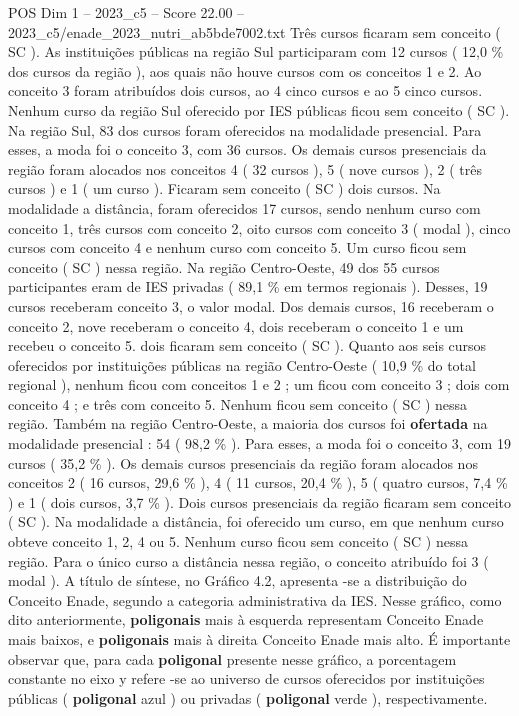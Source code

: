 \begin{textsample}{POS Dim 1 – 2023\_c5 – Score 22.00 – 2023\_c5/enade\_2023\_nutri\_ab5bde7002.txt}
Três cursos ficaram sem conceito ( SC ).
As instituições públicas na região Sul participaram com 12 cursos ( 12,0 \% dos cursos da região ), aos quais não houve cursos com os conceitos 1 e 2.
Ao conceito 3 foram atribuídos dois cursos, ao 4 cinco cursos e ao 5 cinco cursos.
Nenhum curso da região Sul oferecido por IES públicas ficou sem conceito ( SC ).
Na região Sul, 83 dos cursos foram oferecidos na modalidade presencial.
Para esses, a moda foi o conceito 3, com 36 cursos.
Os demais cursos presenciais da região foram alocados nos conceitos 4 ( 32 cursos ), 5 ( nove cursos ), 2 ( três cursos ) e 1 ( um curso ).
Ficaram sem conceito ( SC ) dois cursos.
Na modalidade a distância, foram oferecidos 17 cursos, sendo nenhum curso com conceito 1, três cursos com conceito 2, oito cursos com conceito 3 ( modal ), cinco cursos com conceito 4 e nenhum curso com conceito 5.
Um curso ficou sem conceito ( SC ) nessa região.
Na região Centro-Oeste, 49 dos 55 cursos participantes eram de IES privadas ( 89,1 \% em termos regionais ).
Desses, 19 cursos receberam conceito 3, o valor modal.
Dos demais cursos, 16 receberam o conceito 2, nove receberam o conceito 4, dois receberam o conceito 1 e um recebeu o conceito 5. dois ficaram sem conceito ( SC ).
Quanto aos seis cursos oferecidos por instituições públicas na região Centro-Oeste ( 10,9 \% do total regional ), nenhum ficou com conceitos 1 e 2 ; um ficou com conceito 3 ; dois com conceito 4 ; e três com conceito 5.
Nenhum ficou sem conceito ( SC ) nessa região.
Também na região Centro-Oeste, a maioria dos cursos foi \textbf{ofertada} na modalidade presencial : 54 ( 98,2 \% ).
Para esses, a moda foi o conceito 3, com 19 cursos ( 35,2 \% ).
Os demais cursos presenciais da região foram alocados nos conceitos 2 ( 16 cursos, 29,6 \% ), 4 ( 11 cursos, 20,4 \% ), 5 ( quatro cursos, 7,4 \% ) e 1 ( dois cursos, 3,7 \% ).
Dois cursos presenciais da região ficaram sem conceito ( SC ).
Na modalidade a distância, foi oferecido um curso, em que nenhum curso obteve conceito 1, 2, 4 ou 5.
Nenhum curso ficou sem conceito ( SC ) nessa região.
Para o único curso a distância nessa região, o conceito atribuído foi 3 ( modal ).
A título de síntese, no Gráfico 4.2, apresenta -se a distribuição do Conceito Enade, segundo a categoria administrativa da IES.
Nesse gráfico, como dito anteriormente, \textbf{poligonais} mais à esquerda representam Conceito Enade mais baixos, e \textbf{poligonais} mais à direita Conceito Enade mais alto.
É importante observar que, para cada \textbf{poligonal} presente nesse gráfico, a porcentagem constante no eixo y refere -se ao universo de cursos oferecidos por instituições públicas ( \textbf{poligonal} azul ) ou privadas ( \textbf{poligonal} verde ), respectivamente.

\end{textsample}
